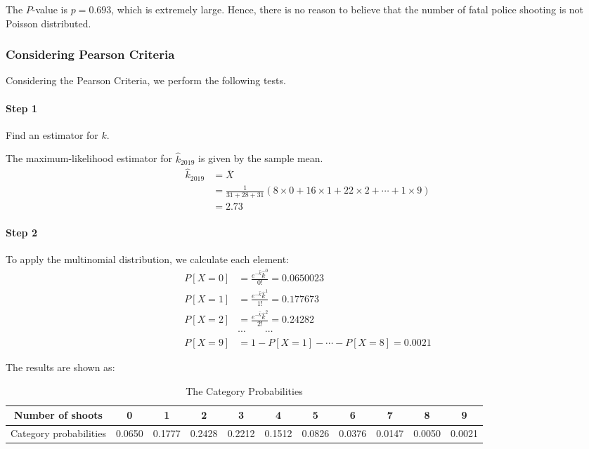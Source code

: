 \documentclass[a4paper]{article}
\begin{document}
The $P$-value is $p=0.693$, which is extremely large. Hence, there is no reason to believe that the number of fatal police shooting is not Poisson distributed.

\subsubsection{Considering Pearson Criteria}
Considering the Pearson Criteria, we perform the following tests.
\paragraph{Step 1} Find an estimator for $k$.

The maximum-likelihood estimator for $\widehat{k}_{2019}$ is given by the sample mean.
\begin{align*}
\widehat{k}_{2019}
&=\overline{X}\\
&=\displaystyle\frac{1}{31+28+31}(8\times 0+16\times 1+22\times 2+\cdots+1\times 9)\\
&= 2.73
\end{align*}

\paragraph{Step 2} To apply the multinomial distribution, we calculate each element:
\begin{align*}
P[X=0] &=\displaystyle\frac{e^{-\widehat{k}}\widehat{k}^0}{0!}=0.0650023\\
P[X=1] &=\displaystyle\frac{e^{-\widehat{k}}\widehat{k}^1}{1!}=0.177673\\
P[X=2] &=\displaystyle\frac{e^{-\widehat{k}}\widehat{k}^2}{2!}=0.24282\\
&\cdots \qquad \cdots\\
P[X=9] &=1-P[X=1]-\cdots-P[X=8]=0.0021
\end{align*}

The results are shown as:
\begin{table}[!htbp]
  \centering
    \begin{tabular}{ccccccccccc}
    \hline
    Number of shoots & 0     & 1     & 2     & 3     & 4     & 5     & 6     & 7     & 8     & 9 \\
    \hline
    Category probabilities & 0.0650  & 0.1777  & 0.2428  & 0.2212  & 0.1512  & 0.0826  & 0.0376  & 0.0147  & 0.0050  & 0.0021  \\
    \hline
    \end{tabular}%
    \caption{The Category Probabilities}
\end{table}%
\end{document}
